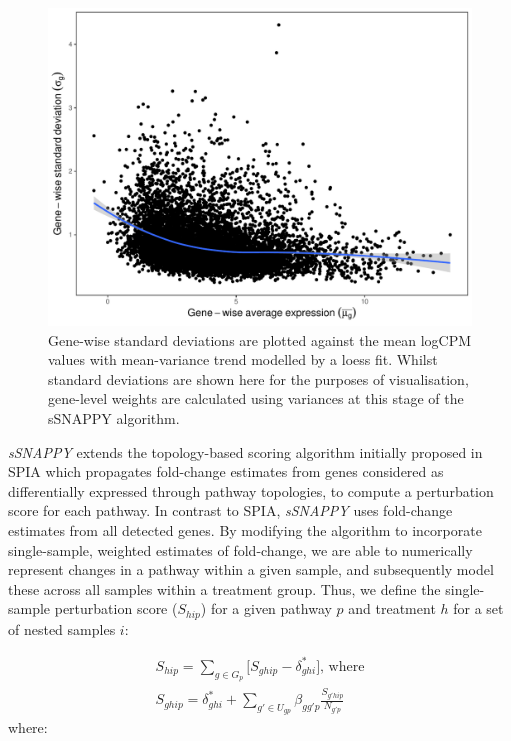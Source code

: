 \documentclass[9pt,a4paper,]{extarticle}
\begin{document}
\begin{figure}[h]

{\centering \includegraphics[width=1\linewidth]{sSNAPPY_paper_files/figure-latex/Figure2} 

}

\caption{Gene-wise standard deviations are plotted against the mean logCPM values with mean-variance trend modelled by a loess fit. Whilst standard deviations are shown here for the purposes of visualisation, gene-level weights are calculated using variances at this stage of the sSNAPPY algorithm.}\label{fig:Figure2}
\end{figure}

\emph{sSNAPPY} extends the topology-based scoring algorithm initially proposed in SPIA\citep{Tarca2009} which propagates fold-change estimates from genes considered as differentially expressed through pathway topologies, to compute a perturbation score for each pathway.
In contrast to SPIA, \emph{sSNAPPY} uses fold-change estimates from all detected genes.
By modifying the algorithm to incorporate single-sample, weighted estimates of fold-change, we are able to numerically represent changes in a pathway within a given sample, and subsequently model these across all samples within a treatment group.
Thus, we define the single-sample perturbation score (\(S_{hip}\)) for a given pathway \(p\) and treatment \(h\) for a set of nested samples \(i\):

\[
\begin{aligned}
S_{hip} = \sum_{g \in G_p} \lbrack S_{ghip} - \delta_{ghi}^*\rbrack \text{, where} \\
S_{ghip} = \delta_{ghi}^* + \sum_{g' \in U_{gp}} \beta_{gg'p} \frac{S_{g'hip}}{N_{g'p}} 
\end{aligned}
\]
where:
\end{document}
